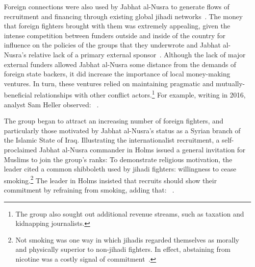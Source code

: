 Foreign connections were also used by Jabhat al-Nusra to generate flows of recruitment and financing through existing global jihadi networks~\autocite{sherlock2012inside}. The money that foreign fighters brought with them was extremely appealing, given the intense competition between funders outside and inside of the country for influence on the policies of the groups that they underwrote and Jabhat al-Nusra's relative lack of a primary external sponsor~\autocite{heller2016keeping}. Although the lack of major external funders allowed Jabhat al-Nusra some distance from the demands of foreign state backers, it did increase the importance of local money-making ventures. In turn, these ventures relied on maintaining pragmatic and mutually-beneficial relationships with other conflict actors.\footnote{The group also sought out additional revenue streams, such as taxation and kidnapping journalists.} For example, writing in 2016,  analyst Sam Heller observed: ~\autocite{heller2016keeping}.

The group began to attract an increasing number of foreign fighters, and particularly those motivated by Jabhat al-Nusra's status as a Syrian branch of the Islamic State of Iraq.  Illustrating the internationalist recruitment, a self-proclaimed Jabhat al-Nusra commander in Holms issued a general invitation for Muslims to join the group's ranks: To demonstrate religious motivation, the leader cited a common shibboleth used by jihadi fighters: willingness to cease smoking.\footnote{Not smoking was one way in which jihadis regarded themselves as morally and physically superior to non-jihadi fighters. In effect, abstaining from nicotine was a costly signal of  commitment~\autocite{hegghammer2013recruiter}.} The leader in Holms insisted that recruits should show their commitment by refraining from smoking, adding that: ~\autocite{sherlock2012inside}.

